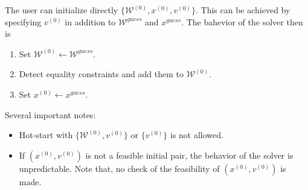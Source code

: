 \documentclass[12pt,a4paper]{article}
\begin{document}
The user can initialize directly $\{\mathcal{W}^{(0)}, x^{(0)}, v^{(0)}\}$. This can be achieved by
specifying $v^{(0)}$ in addition to $\mathcal{W}^{\mathit{guess}}$ and $x^{\mathit{guess}}$. The bahevior of the solver then is
%
\begin{enumerate}
\item Set $\mathcal{W}^{(0)} \leftarrow \mathcal{W}^{\mathit{guess}}$.
\item Detect equality constraints and add them to $\mathcal{W}^{(0)}$.
\item Set $x^{(0)} \leftarrow x^{\mathit{guess}}$.
\end{enumerate}
%
Several important notes:
%
\begin{itemize}
\item Hot-start with $\{\mathcal{W}^{(0)}, v^{(0)}\}$ or $\{v^{(0)}\}$ is not allowed.
\item If $(x^{(0)}, v^{(0)})$ is not a feasible initial pair, the behavior of the solver is
  unpredictable. Note that, no check of the feasibility of $(x^{(0)}, v^{(0)})$ is made.
\end{itemize}
\end{document}
